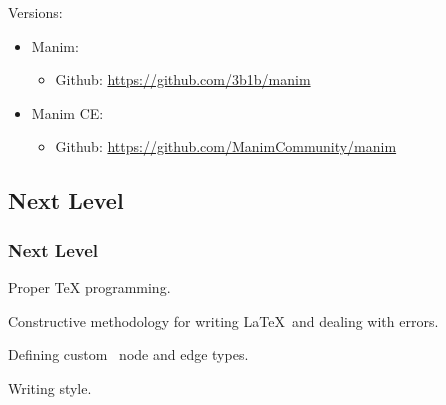 {\begin{frame}[fragile]
  \pause
  \vspace{5mm}
  Versions:
  \begin{itemize}
    \item Manim:
      \begin{itemize}
        \item Github: \textcolor{blue}{\url{https://github.com/3b1b/manim}}
      \end{itemize}
    \item Manim CE:
      \begin{itemize}
        \item Github: \textcolor{blue}{\url{https://github.com/ManimCommunity/manim}}
      \end{itemize}
  \end{itemize}
\end{frame}

\subsection{Next Level}
\begin{frame}[fragile]
  \frametitle{Next Level}
  \vspace{3mm}
  Proper TeX programming.
  
  \vspace{5mm}
  Constructive methodology for writing \LaTeX\ and dealing with errors.
  
  \vspace{5mm}
  Defining custom \TikZ\ node and edge types.
  
  \vspace{5mm}
  Writing style.
\end{frame}

}


